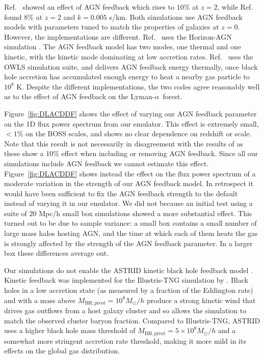 \documentclass[a4paper,11pt]{article}
\newcommand{\Lya}{Lyman-$\alpha$}
\begin{document}
Ref.~\cite{Viel:2013} showed an effect of AGN feedback which rises to $10\%$ at $z=2$, while Ref.~\cite{Chabanier:2020} found $8\%$ at $z=2$ and $k = 0.005$ s/km. Both simulations use AGN feedback models with parameters tuned to match the properties of galaxies at $z=0$. However, the implementations are different. Ref.~\cite{Chabanier:2020} uses the Horizon-AGN simulation \cite{Dubois:2016}. The AGN feedback model has two modes, one thermal and one kinetic, with the kinetic mode dominating at low accretion rates. Ref.~\cite{Viel:2013} uses the OWLS simulation suite, and delivers AGN feedback energy thermally, once black hole accretion has accumulated enough energy to heat a nearby gas particle to $10^8$ K. Despite the different implementations, the two codes agree reasonably well as to the effect of AGN feedback on the \Lya~forest.

Figure~\ref{fig:DLACDDF} shows the effect of varying our AGN feedback parameter on the 1D flux power spectrum from our emulator. This effect is extremely small, $<1\%$ on the BOSS scales, and shows no clear dependence on redshift or scale. Note that this result is not necessarily in disagreement with the results of \cite{Viel:2013, Chabanier:2020} as these show a 10\% effect when including or removing AGN feedback. Since all our simulations include AGN feedback we cannot estimate this effect. Figure~\ref{fig:DLACDDF} shows instead the effect on the flux power spectrum of a moderate variation in the strength of our AGN feedback model.
In retrospect it would have been sufficient to fix the AGN feedback strength to the default instead of varying it in our emulator. We did not because an initial test using a suite of $20$ Mpc/h small box simulations showed a more substantial effect. This turned out to be due to sample variance: a small box contains a small number of large mass halos hosting AGN, and the time at which each of them heats the gas is strongly affected by the strength of the AGN feedback parameter. In a larger box these differences average out.


Our simulations do not enable the ASTRID kinetic black hole feedback model \cite{Ni:2023}. Kinetic feedback was implemented for the Illustris-TNG simulation by \cite{Weinberger:2017}. Black holes in a low accretion state (as measured by a fraction of the Eddington rate) and with a mass above $M_\mathrm{BH, pivot} = 10^8 M_\odot/h$ produce a strong kinetic wind that drives gas outflows from a host galaxy cluster and so allows the simulation to match the observed cluster baryon fraction. Compared to Illustris-TNG, ASTRID uses a higher black hole mass threshold of $M_\mathrm{BH, pivot} = 5\times 10^8 M_\odot/h$ and a somewhat more stringent accretion rate threshold, making it more mild in its effects on the global gas distribution.
\end{document}
